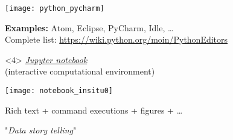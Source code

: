 \begin{frame}[fragile, c]
\begin{onlyenv}
\vfill
\texttt{[image: python\_pycharm]}
\vfill

\textbf{Examples:} Atom, Eclipse, PyCharm, Idle, \ldots\\
Complete list: \url{https://wiki.python.org/moin/PythonEditors}
\end{onlyenv}

\begin{onlyenv}<4>
\href{https://jupyter.org/}{\textit{Jupyter notebook}}\\
(interactive computational environment)

\vfill
\texttt{[image: notebook\_insitu0]}
\vfill

Rich text + command executions + figures + \ldots

"\textit{Data story telling}"
\end{onlyenv}

\end{frame}


